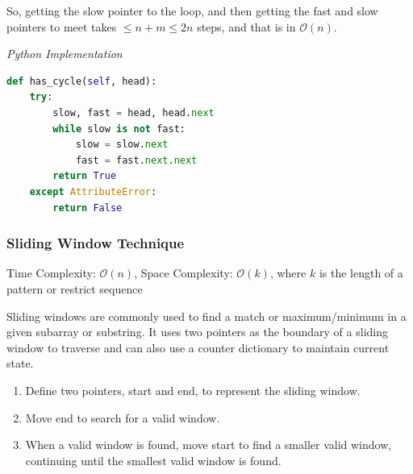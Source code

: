 \documentclass{article}
\newcommand{\bigO}{\mathcal{O}}
\begin{document}
    So, getting the slow pointer to the loop, and then getting the fast and slow pointers to meet takes $\leq n + m \leq 2n$ steps, and that is in $\bigO(n)$.

\vspace{8pt} \emph{Python Implementation}
\begin{lstlisting}[language=Python]
def has_cycle(self, head):
    try:
        slow, fast = head, head.next
        while slow is not fast:
            slow = slow.next
            fast = fast.next.next
        return True
    except AttributeError:
        return False
\end{lstlisting}


    \subsubsection{Sliding Window Technique}
    Time Complexity: $\bigO(n)$, Space Complexity: $\bigO(k)$, where $k$ is the length of a pattern or restrict sequence 
    
    Sliding windows are commonly used to find a match or maximum/minimum in a given subarray or substring. It uses two pointers as the boundary of a sliding window to traverse and can also use a counter dictionary to maintain current state.
    
    \begin{enumerate}
        \item Define two pointers, start and end, to represent the sliding window.
        \item Move end to search for a valid window.
        \item When a valid window is found, move start to find a smaller valid window, continuing until the smallest valid window is found.
    \end{enumerate}
\end{document}
